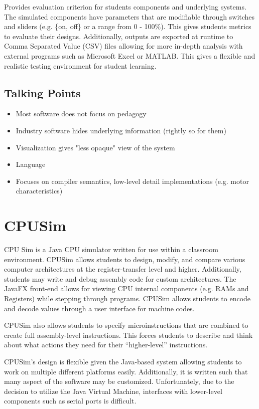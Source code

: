 Provides evaluation criterion for students components and underlying systems. The simulated components have parameters that are modifiable through switches and sliders (e.g. \{on, off\} or a range from 0 - 100\%). This gives students metrics to evaluate their designs. Additionally, outputs are exported at runtime to Comma Separated Value (CSV) files allowing for more in-depth analysis with external programs such as Microsoft Excel or MATLAB. This gives a flexible and realistic testing environment for student learning. 

\subsection{Talking Points}

\begin{itemize}
\item Most software does not focus on pedagogy
\item Industry software hides underlying information (rightly so for them)
\item Visualization gives "less opaque" view of the system
\item Language 
\item Focuses on compiler semantics, low-level detail implementations (e.g. motor characteristics)
\end{itemize}

\section{CPUSim}

\cite{Skrien2001}

CPU Sim is a Java CPU simulator written for use within a classroom environment. CPUSim allows students to design, modify, and compare various computer architectures at the register-transfer level and higher. Additionally, students may write and debug assembly code for custom architectures. The JavaFX front-end allows for viewing CPU internal components (e.g. RAMs and Registers) while stepping through programs. CPUSim allows students to encode and decode values through a user interface for machine codes. 

CPUSim also allows students to specify microinstructions that are combined to create full assembly-level instructions. This forces students to describe and think about what actions they need for their ``higher-level'' instructions. 

CPUSim's design is flexible given the Java-based system allowing students to work on multiple different platforms easily. Additionally, it is written such that many aspect of the software may be customized. Unfortunately, due to the decision to utilize the Java Virtual Machine, interfaces with lower-level components such as serial ports is difficult. 

